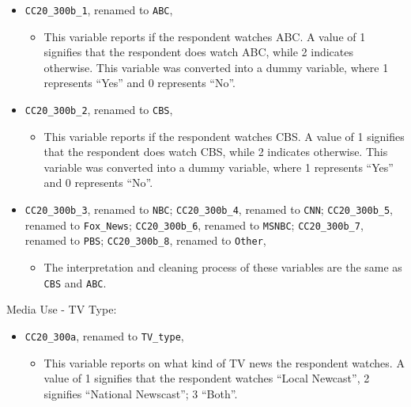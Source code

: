 \documentclass[
  letterpaper,
  DIV=11,
  numbers=noendperiod]{scrartcl}
\providecommand{\tightlist}{%
  \setlength{\itemsep}{0pt}\setlength{\parskip}{0pt}}\usepackage{longtable,booktabs,array}
\begin{document}
\begin{itemize}
\item
  \texttt{CC20\_300b\_1}, renamed to \texttt{ABC},

  \begin{itemize}
  \tightlist
  \item
    This variable reports if the respondent watches ABC. A value of 1
    signifies that the respondent does watch ABC, while 2 indicates
    otherwise. This variable was converted into a dummy variable, where
    1 represents ``Yes'' and 0 represents ``No''.
  \end{itemize}
\item
  \texttt{CC20\_300b\_2}, renamed to \texttt{CBS},

  \begin{itemize}
  \tightlist
  \item
    This variable reports if the respondent watches CBS. A value of 1
    signifies that the respondent does watch CBS, while 2 indicates
    otherwise. This variable was converted into a dummy variable, where
    1 represents ``Yes'' and 0 represents ``No''.
  \end{itemize}
\item
  \texttt{CC20\_300b\_3}, renamed to \texttt{NBC};
  \texttt{CC20\_300b\_4}, renamed to \texttt{CNN};
  \texttt{CC20\_300b\_5}, renamed to \texttt{Fox\_News};
  \texttt{CC20\_300b\_6}, renamed to \texttt{MSNBC};
  \texttt{CC20\_300b\_7}, renamed to \texttt{PBS};
  \texttt{CC20\_300b\_8}, renamed to \texttt{Other},

  \begin{itemize}
  \tightlist
  \item
    The interpretation and cleaning process of these variables are the
    same as \texttt{CBS} and \texttt{ABC}.
  \end{itemize}
\end{itemize}

Media Use - TV Type:

\begin{itemize}
\item
  \texttt{CC20\_300a}, renamed to \texttt{TV\_type},

  \begin{itemize}
  \tightlist
  \item
    This variable reports on what kind of TV news the respondent
    watches. A value of 1 signifies that the respondent watches ``Local
    Newcast'', 2 signifies ``National Newscast''; 3 ``Both''.
  \end{itemize}
\end{itemize}
\end{document}
